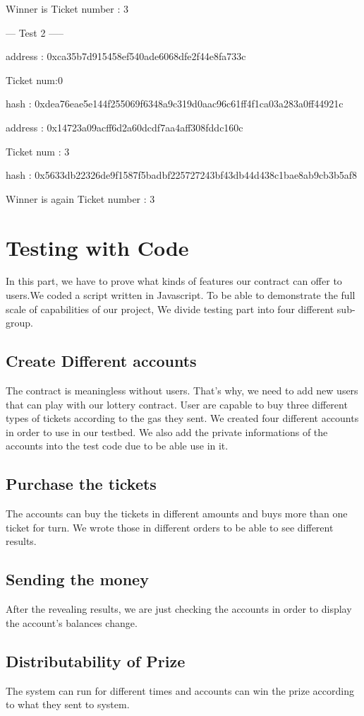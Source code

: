 \documentclass[]{scrreprt}
\begin{document}
		Winner is Ticket number : 3

		--- Test 2 -----

		address : 0xca35b7d915458ef540ade6068dfe2f44e8fa733c
		
		Ticket num:0 
		
		hash : 0xdea76eae5e144f255069f6348a9c319d0aac96c61ff4f1ca03a283a0ff44921c

		address : 0x14723a09acff6d2a60dcdf7aa4aff308fddc160c
		
		Ticket num : 3
		
		hash : 0x5633db22326de9f1587f5badbf225727243bf43db44d438c1bae8ab9cb3b5af8

		Winner is again Ticket number : 3
		\section{Testing with Code}
		 In this part, we have to prove what kinds of features our contract can offer to users.We coded a script written in Javascript\cite{JavaScript}.  To be able to demonstrate the full scale of capabilities of our project, We divide testing part into four different sub-group.
		  \subsection{Create Different accounts}
			The contract is meaningless without users. That's why, we need to add new users that can play with our lottery contract. User are capable to buy three different types of tickets according to the gas they sent. We created four different accounts in order to use in our testbed. We also add the private informations of the accounts into the test code due to be able use in it.
			\subsection{Purchase the tickets}
			The accounts can buy the tickets in different amounts and buys more than one ticket for turn. We wrote  those in different orders to be able to see different results. 
			\subsection{Sending the money}
			After the revealing results, we are just checking the accounts in order to display the account's balances change. 
			\subsection{Distributability of Prize}
			The system can run for different times and accounts can win the prize according to what they sent to system.
			
\end{document}

